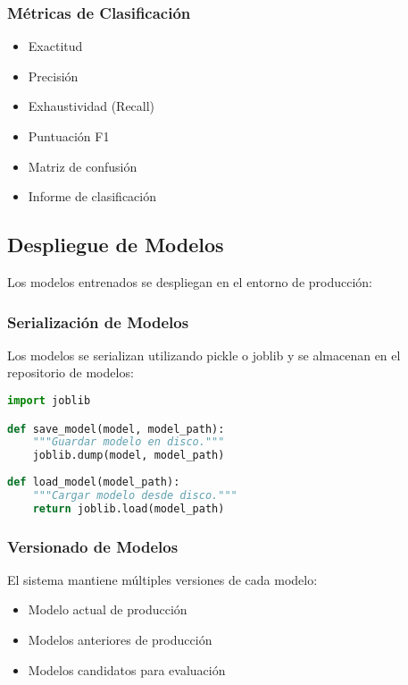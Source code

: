 \subsubsection{Métricas de Clasificación}
\begin{itemize}
    \item Exactitud
    \item Precisión
    \item Exhaustividad (Recall)
    \item Puntuación F1
    \item Matriz de confusión
    \item Informe de clasificación
\end{itemize}

\subsection{Despliegue de Modelos}
Los modelos entrenados se despliegan en el entorno de producción:

\subsubsection{Serialización de Modelos}
Los modelos se serializan utilizando pickle o joblib y se almacenan en el repositorio de modelos:

\begin{lstlisting}[language=Python, caption=Serialización de Modelos]
import joblib

def save_model(model, model_path):
    """Guardar modelo en disco."""
    joblib.dump(model, model_path)
    
def load_model(model_path):
    """Cargar modelo desde disco."""
    return joblib.load(model_path)
\end{lstlisting}

\subsubsection{Versionado de Modelos}
El sistema mantiene múltiples versiones de cada modelo:

\begin{itemize}
    \item Modelo actual de producción
    \item Modelos anteriores de producción
    \item Modelos candidatos para evaluación
\end{itemize}

